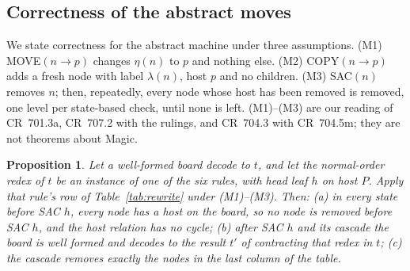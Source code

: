 \documentclass[11pt]{article}
\newtheorem{proposition}{Proposition}
\theoremstyle{definition}
\newcommand{\CR}[1]{CR~#1}
\newcommand{\mv}{\to}
\begin{document}
\subsection{Correctness of the abstract moves}

We state correctness for the abstract machine under three assumptions.
(M1) MOVE$(n\mv p)$ changes $\eta(n)$ to $p$ and nothing else.
(M2) COPY$(n\mv p)$ adds a fresh node with label $\lambda(n)$, host $p$ and no children.
(M3) SAC$(n)$ removes $n$; then, repeatedly, every node whose host has been removed is
removed, one level per state-based check, until none is left.
(M1)--(M3) are our reading of \CR{701.3a}, \CR{707.2} with the rulings, and \CR{704.3} with
\CR{704.5m}; they are not theorems about Magic.

\begin{proposition}\label{prop:rows}
Let a well-formed board decode to $t$, and let the normal-order redex of $t$ be an
instance of one of the six rules, with head leaf $h$ on host $P$. Apply that rule's row of
Table~\ref{tab:rewrite} under (M1)--(M3). Then:
(a) in every state before SAC $h$, every node has a host on the board, so no node is
removed before SAC $h$, and the host relation has no cycle;
(b) after SAC $h$ and its cascade the board is well formed and decodes to the result
$t'$ of contracting that redex in $t$;
(c) the cascade removes exactly the nodes in the last column of the table.
\end{proposition}
\end{document}

